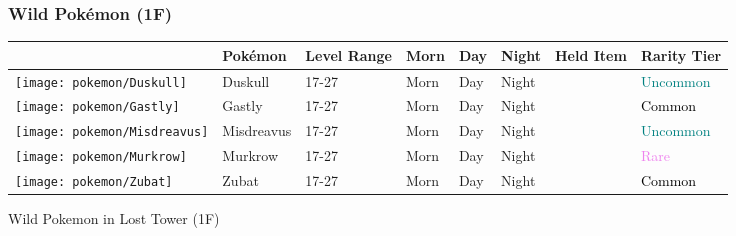 \subsubsection{Wild Pokémon (1F)}%
\label{ssubsec:WildPokmon(1F)}%
\begin{longtable}{||l l l l l l l l||}%
\hline%
&Pokémon&Level Range&Morn&Day&Night&Held Item&Rarity Tier\\%
\hline%
\endhead%
\hline%
\texttt{[image: pokemon/Duskull]}&Duskull&17{-}27&Morn&Day&Night&&\textcolor{teal}{%
Uncommon%
}\\%
\hline%
\texttt{[image: pokemon/Gastly]}&Gastly&17{-}27&Morn&Day&Night&&\textcolor{black}{%
Common%
}\\%
\hline%
\texttt{[image: pokemon/Misdreavus]}&Misdreavus&17{-}27&Morn&Day&Night&&\textcolor{teal}{%
Uncommon%
}\\%
\hline%
\texttt{[image: pokemon/Murkrow]}&Murkrow&17{-}27&Morn&Day&Night&&\textcolor{violet}{%
Rare%
}\\%
\hline%
\texttt{[image: pokemon/Zubat]}&Zubat&17{-}27&Morn&Day&Night&&\textcolor{black}{%
Common%
}\\%
\hline%
\end{longtable}%
\caption{Wild Pokemon in Lost Tower (1F)}